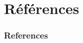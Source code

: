 \documentclass[12pt,aspectratio=43,dvipsnames,table]{beamer}
\begin{document}
\appendix

\section{Références}


\begin{frame}[allowframebreaks]
    \frametitle{References}
    
    
\end{frame}
\end{document}
